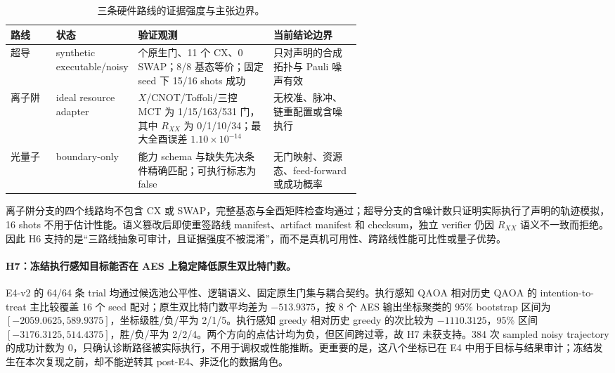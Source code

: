 \documentclass[UTF8,fontset=fandol,11pt]{ctexart}
\newcommand{\qaoa}{\ensuremath{\mathrm{QAOA}}}
\begin{document}
\begin{table}[H]
\centering
\small
\setlength{\tabcolsep}{3pt}
\caption{三条硬件路线的证据强度与主张边界。}
\label{tab:hardware-routes-zh}
\begin{tabularx}{\linewidth}{>{\raggedright\arraybackslash}p{0.13\linewidth}>{\raggedright\arraybackslash}p{0.20\linewidth}>{\raggedright\arraybackslash}X>{\raggedright\arraybackslash}p{0.25\linewidth}}
\toprule
路线 & 状态 & 验证观测 & 当前结论边界 \\
\midrule
超导 & synthetic executable/noisy & 25 个原生门、11 个 CX、0 SWAP；8/8 基态等价；固定 seed 下 15/16 shots 成功 & 只对声明的合成拓扑与 Pauli 噪声有效 \\
离子阱 & ideal resource adapter & $X$/CNOT/Toffoli/三控 MCT 为 1/15/163/531 门，其中 $R_{XX}$ 为 0/1/10/34；最大全酉误差 $1.10\times10^{-14}$ & 无校准、脉冲、链重配置或含噪执行 \\
光量子 & boundary-only & 能力 schema 与缺失先决条件精确匹配；可执行标志为 false & 无门映射、资源态、feed-forward 或成功概率 \\
\bottomrule
\end{tabularx}
\end{table}

离子阱分支的四个线路均不包含 CX 或 SWAP，完整基态与全酉矩阵检查均通过；超导分支的含噪计数只证明实际执行了声明的轨迹模拟，16 shots 不用于估计性能。语义篡改后即使重签路线 manifest、artifact manifest 和 checksum，独立 verifier 仍因 $R_{XX}$ 语义不一致而拒绝。因此 H6 支持的是“三路线抽象可审计，且证据强度不被混淆”，而不是真机可用性、跨路线性能可比性或量子优势。

\paragraph{H7：冻结执行感知目标能否在 AES 上稳定降低原生双比特门数。}
E4-v2 的 64/64 条 trial 均通过候选池公平性、逻辑语义、固定原生门集与耦合契约。执行感知 \qaoa{} 相对历史 \qaoa{} 的 intention-to-treat 主比较覆盖 16 个 seed 配对；原生双比特门数平均差为 $-513.9375$，按 8 个 AES 输出坐标聚类的 95\% bootstrap 区间为 $[-2059.0625,589.9375]$，坐标级胜/负/平为 2/1/5。执行感知 greedy 相对历史 greedy 的次比较为 $-1110.3125$，95\% 区间 $[-3176.3125,514.4375]$，胜/负/平为 2/2/4。两个方向的点估计均为负，但区间跨过零，故 H7 未获支持。384 次 sampled noisy trajectory 的成功计数为 0，只确认诊断路径被实际执行，不用于调权或性能推断。更重要的是，这八个坐标已在 E4 中用于目标与结果审计；冻结发生在本次复现之前，却不能逆转其 post-E4、非泛化的数据角色。
\end{document}
